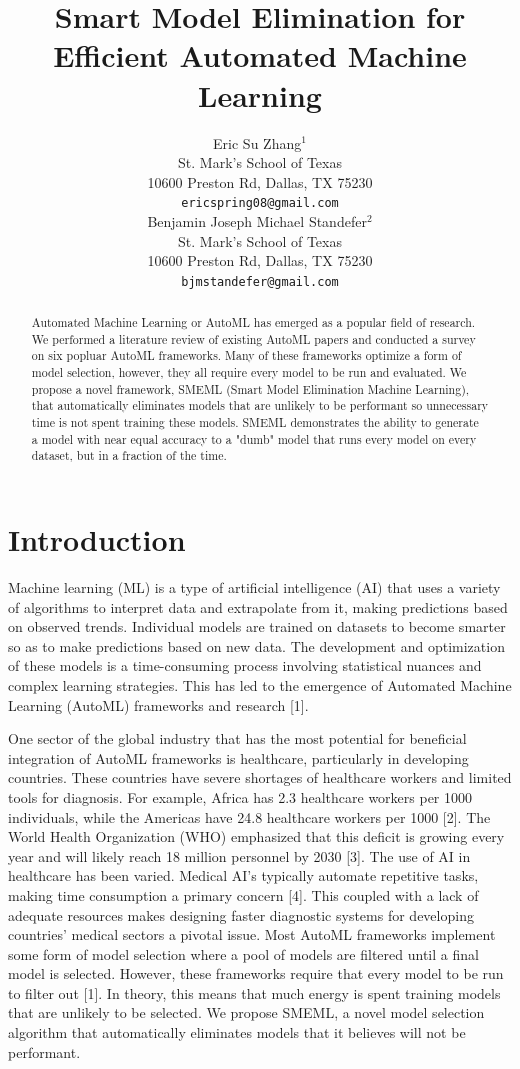 \documentclass{article}
\title{Smart Model Elimination for Efficient Automated Machine Learning}
\author{%
  Eric Su Zhang$^1$ \\
  St. Mark's School of Texas\\
  10600 Preston Rd, Dallas, TX 75230\\
  \texttt{ericspring08@gmail.com} \\
  \And
  Benjamin Joseph Michael Standefer$^2$ \\
  St. Mark's School of Texas \\
  10600 Preston Rd, Dallas, TX 75230 \\
  \texttt{bjmstandefer@gmail.com} \\
}
\begin{document}
\maketitle


\begin{abstract}
  Automated Machine Learning or AutoML has emerged as a popular field of research. We performed a literature review of existing AutoML papers and conducted a survey on six popluar AutoML frameworks. Many of these frameworks optimize a form of model selection, however, they all require every model to be run and evaluated. We propose a novel framework, SMEML (Smart Model Elimination Machine Learning), that automatically eliminates models that are unlikely to be performant so unnecessary time is not spent training these models. SMEML demonstrates the ability to generate a model with near equal accuracy to a "dumb" model that runs every model on every dataset, but in a fraction of the time.
\end{abstract}


\section{Introduction}

Machine learning (ML) is a type of artificial intelligence (AI) that uses a variety of algorithms to interpret data and extrapolate from it, making predictions based on observed trends. Individual models are trained on datasets to become smarter so as to make predictions based on new data. The development and optimization of these models is a time-consuming process involving statistical nuances and complex learning strategies. This has led to the emergence of Automated Machine Learning (AutoML) frameworks and research [1]. 

One sector of the global industry that has the most potential for beneficial integration of AutoML frameworks is healthcare, particularly in developing countries. These countries have severe shortages of healthcare workers and limited tools for diagnosis. For example, Africa has 2.3 healthcare workers per 1000 individuals, while the Americas have 24.8 healthcare workers per 1000 [2]. The World Health Organization (WHO) emphasized that this deficit is growing every year and will likely reach 18 million personnel by 2030 [3]. The use of AI in healthcare has been varied. Medical AI's typically automate repetitive tasks, making time consumption a primary concern [4]. This coupled with a lack of adequate resources makes designing faster diagnostic systems for developing countries' medical sectors a pivotal issue. 
%
Most AutoML frameworks implement some form of model selection where a pool of models are filtered until a final model is selected. However, these frameworks require that every model to be run to filter out [1]. In theory, this means that much energy is spent training models that are unlikely to be selected. We propose SMEML, a novel model selection algorithm that automatically eliminates models that it believes will not be performant. 
\end{document}
